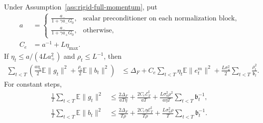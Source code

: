 \begin{theorem}
\label{thm:rigid-full-convergence}
Under Assumption~\ref{ass:rigid-full-momentum}, put
\begin{align}
 a&=\begin{cases}
 \displaystyle\frac{a_-}{1+\gamma a_-G_0},&\text{scalar preconditioner on each normalization block},\\[3pt]
 \displaystyle\frac{a_-}{1+\gamma a_+G_0},&\text{otherwise},
 \end{cases}\\
 C_e&=a^{-1}+L\eta_{\max}.
\end{align}
If $\eta_t\le a/(4La_+^2)$ and $\rho_t\le L^{-1}$, then
\begin{align}\label{eq:rigid-full-budget}
 \sum_{t<T}\left(\frac{a\eta_t}{2}\mathbb E\|g_t\|^2+
 \frac{\rho_t}{2}\mathbb E\|b_t\|^2\right)
 &\le\Delta_F+C_e\sum_{t<T}\eta_t\mathbb E\|e_{t}^{m}\|^2+
 \frac{L\sigma_u^2}{2}\sum_{t<T}\frac{\rho_t^2}{\mathfrak b_t}.
\end{align}
For constant steps,
\begin{align}\label{eq:rigid-full-rates-explicit}
 \frac1T\sum_{t<T}\mathbb E\|g_t\|^2
 &\le\frac{2\Delta_F}{aT\eta}+
 \frac{2C_e\mathscr E_T^\sharp}{aT}+
 \frac{L\sigma_u^2\rho^2}{a\eta T}\sum_{t<T}\mathfrak b_t^{-1},\\
 \frac1T\sum_{t<T}\mathbb E\|b_t\|^2
 &\le\frac{2\Delta_F}{T\rho}+
 \frac{2C_e\eta\mathscr E_T^\sharp}{T\rho}+
 \frac{L\sigma_u^2\rho}{T}\sum_{t<T}\mathfrak b_t^{-1}.
\end{align}
\end{theorem}
